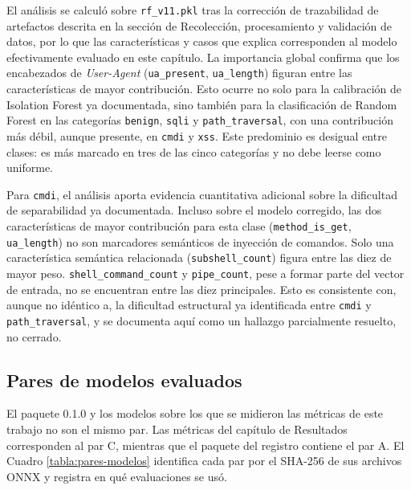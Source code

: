 El análisis se calculó sobre \texttt{rf\_v11.pkl} tras la corrección de trazabilidad de artefactos descrita en la sección de Recolección, procesamiento y validación de datos, por lo que las características y casos que explica corresponden al modelo efectivamente evaluado en este capítulo. La importancia global confirma que los encabezados de \textit{User-Agent} (\texttt{ua\_present}, \texttt{ua\_length}) figuran entre las características de mayor contribución. Esto ocurre no solo para la calibración de Isolation Forest ya documentada, sino también para la clasificación de Random Forest en las categorías \texttt{benign}, \texttt{sqli} y \texttt{path\_traversal}, con una contribución más débil, aunque presente, en \texttt{cmdi} y \texttt{xss}. Este predominio es desigual entre clases: es más marcado en tres de las cinco categorías y no debe leerse como uniforme.

Para \texttt{cmdi}, el análisis aporta evidencia cuantitativa adicional sobre la dificultad de separabilidad ya documentada. Incluso sobre el modelo corregido, las dos características de mayor contribución para esta clase (\texttt{method\_is\_get}, \texttt{ua\_length}) no son marcadores semánticos de inyección de comandos. Solo una característica semántica relacionada (\texttt{subshell\_count}) figura entre las diez de mayor peso. \texttt{shell\_command\_count} y \texttt{pipe\_count}, pese a formar parte del vector de entrada, no se encuentran entre las diez principales. Esto es consistente con, aunque no idéntico a, la dificultad estructural ya identificada entre \texttt{cmdi} y \texttt{path\_traversal}, y se documenta aquí como un hallazgo parcialmente resuelto, no cerrado.

\subsection{Pares de modelos evaluados}\label{sec:pares-modelos}

El paquete 0.1.0 y los modelos sobre los que se midieron las métricas de este trabajo no son el mismo par. Las métricas del capítulo de Resultados corresponden al par C, mientras que el paquete  del registro contiene el par A. El Cuadro \ref{tabla:pares-modelos} identifica cada par por el SHA-256 de sus archivos ONNX y registra en qué evaluaciones se usó.


